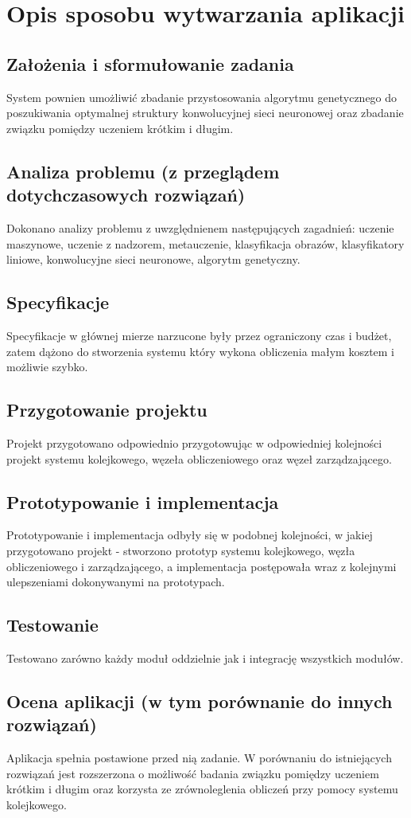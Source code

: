 \section{Opis sposobu wytwarzania aplikacji}
\subsection{Założenia i sformułowanie zadania}
System pownien umożliwić zbadanie przystosowania algorytmu genetycznego do poszukiwania optymalnej struktury konwolucyjnej sieci neuronowej oraz zbadanie związku pomiędzy uczeniem krótkim i długim.
\subsection{Analiza problemu (z przeglądem dotychczasowych rozwiązań)}
Dokonano analizy problemu z uwzględnienem następujących zagadnień: uczenie maszynowe, uczenie z nadzorem, metauczenie, klasyfikacja obrazów, klasyfikatory liniowe, konwolucyjne sieci neuronowe, algorytm genetyczny.
\subsection{Specyfikacje}
Specyfikacje w głównej mierze narzucone były przez ograniczony czas i budżet, zatem dążono do stworzenia systemu który wykona obliczenia małym kosztem i możliwie szybko.
\subsection{Przygotowanie projektu}
Projekt przygotowano odpowiednio przygotowując w odpowiedniej kolejności projekt systemu kolejkowego, węzeła obliczeniowego oraz węzeł zarządzającego.
\subsection{Prototypowanie i implementacja}
Prototypowanie i implementacja odbyły się w podobnej kolejności, w jakiej przygotowano projekt - stworzono prototyp systemu kolejkowego, węzła obliczeniowego i zarządzającego, a implementacja postępowała wraz z kolejnymi ulepszeniami dokonywanymi na prototypach.
\subsection{Testowanie}
Testowano zarówno każdy moduł oddzielnie jak i integrację wszystkich modułów.
\subsection{Ocena aplikacji (w tym porównanie do innych rozwiązań)}
Aplikacja spełnia postawione przed nią zadanie. W porównaniu do istniejących rozwiązań jest rozszerzona o możliwość badania związku pomiędzy uczeniem krótkim i długim oraz korzysta ze zrównoleglenia obliczeń przy pomocy systemu kolejkowego.

